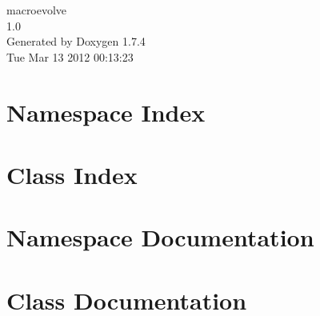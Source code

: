 \documentclass[a4paper]{book}
\begin{document}
\hypersetup{pageanchor=false}
\begin{titlepage}
\vspace*{7cm}
\begin{center}
{\Large macroevolve \\[1ex]\large 1.0 }\\
\vspace*{1cm}
{\large Generated by Doxygen 1.7.4}\\
\vspace*{0.5cm}
{\small Tue Mar 13 2012 00:13:23}\\
\end{center}
\end{titlepage}
\clearemptydoublepage
{}
\tableofcontents
\clearemptydoublepage
{}
\hypersetup{pageanchor=true}
\chapter{Namespace Index}

\chapter{Class Index}

\chapter{Namespace Documentation}









\chapter{Class Documentation}





















\printindex
\end{document}
